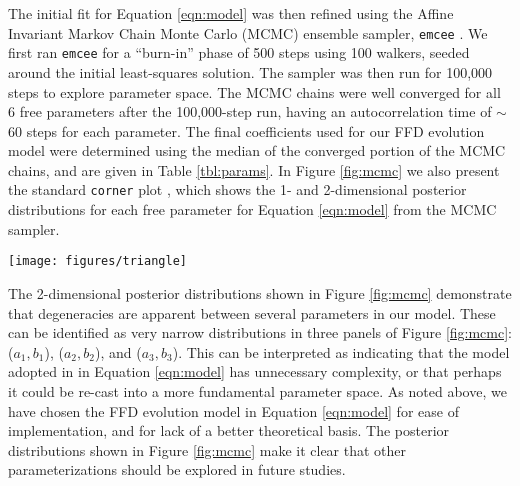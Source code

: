 \documentclass[preprint2]{aastex62}
\begin{document}
The initial fit for Equation \ref{eqn:model} was then refined using the Affine Invariant Markov Chain Monte Carlo (MCMC) ensemble sampler, {\tt emcee} \citep{emcee}. We first ran {\tt emcee}  for a ``burn-in'' phase of 500 steps using 100 walkers, seeded around the initial least-squares solution. The sampler was then run for 100,000 steps to explore parameter space. The MCMC chains were well converged for all 6 free parameters after the 100,000-step run, having an autocorrelation time of $\sim$60 steps for each parameter.
The final coefficients used for our FFD evolution model were determined using the median of the converged portion of the MCMC chains, and are given in Table \ref{tbl:params}. In Figure \ref{fig:mcmc} we also present the standard {\tt corner} plot \citep{corner}, which shows the 1- and 2-dimensional posterior distributions for each free parameter for Equation \ref{eqn:model} from the MCMC sampler.





\begin{figure*}[!t]
\centering
\texttt{[image: figures/triangle]}
\caption{
The standard MCMC sampler result {\tt corner} plot, showing the 1- and 2-dimensional posterior distributions for each free parameter in Eqn. \ref{eqn:model}. The density of points and contours correlate with the posterior probability distribution from a 100,000-step run of the {\tt emcee} sampler. Degeneracies are apparent between several parameters, seen here as very narrow distributions in three panels ($a_1, b_1$), ($a_2, b_2$), and ($a_3, b_3$), indicating our chosen model in Eqn. \ref{eqn:model} may have unnecessary complexity.
}
\label{fig:mcmc}
\end{figure*}


The 2-dimensional posterior distributions shown in Figure \ref{fig:mcmc} demonstrate that degeneracies are apparent between several parameters in our model. These can be identified as very narrow distributions in three panels of Figure \ref{fig:mcmc}: ($a_1, b_1$), ($a_2, b_2$), and ($a_3, b_3$). This can be interpreted as indicating that the model adopted in in Equation \ref{eqn:model} has unnecessary complexity, or that perhaps it could be re-cast into a more fundamental parameter space. As noted above, we have chosen the FFD evolution model in Equation \ref{eqn:model} for ease of implementation, and for lack of a better theoretical basis. The posterior distributions shown in Figure \ref{fig:mcmc} make it clear that other parameterizations should be explored in future studies.
\end{document}
